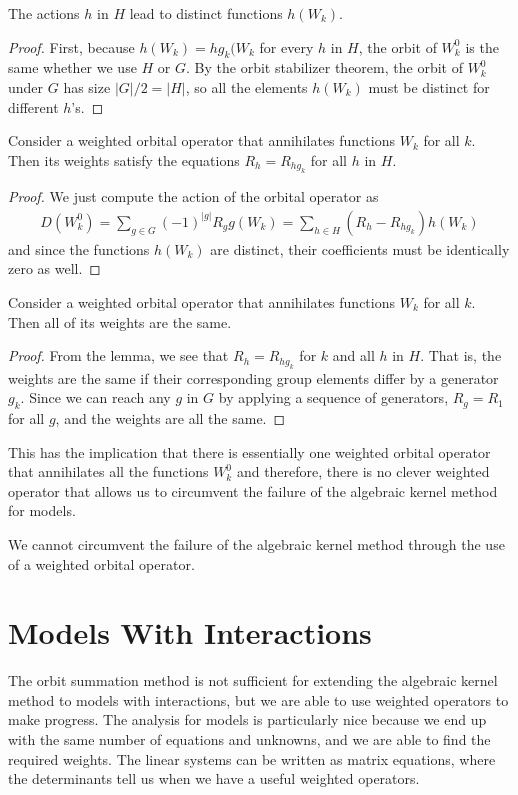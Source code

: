\begin{lem} The actions $h$ in $H$ lead to distinct functions $h(W_k)$.
\end{lem}
\begin{proof} First, because $h(W_k) = hg_k(W_k$ for every $h$ in $H$, the orbit of $W_k^0$ is the same whether we use $H$ or $G$. By the orbit stabilizer theorem, the orbit of $W_k^0$ under $G$ has size $|G|/2 = |H|$, so all the elements $h(W_k)$ must be distinct for different $h$'s.
\end{proof}

\begin{lem} Consider a weighted orbital operator that annihilates functions $W_k$ for all $k$. Then its weights satisfy the equations $R_h = R_{hg_k}$ for all $h$ in $H$.
\end{lem}
\begin{proof} We just compute the action of the orbital operator as
\begin{align}
	D(W_k^0) = \sum_{g \in G} (-1)^{|g|} R_g g(W_k)  = \sum_{h \in H} (R_h-R_{hg_k})h(W_k)
\end{align}
and since the functions $h(W_k)$ are distinct, their coefficients must be identically zero as well.
\end{proof}

\begin{thm} Consider a weighted orbital operator that annihilates functions $W_k$ for all $k$. Then all of its weights are the same.
\end{thm}
\begin{proof} From the lemma, we see that $R_h = R_{hg_k}$ for $k$ and all $h$ in $H$. That is, the weights are the same if their corresponding group elements differ by a generator $g_k$. Since we can reach any $g$ in $G$ by applying a sequence of generators, $R_g = R_1$ for all $g$, and the weights are all the same.
\end{proof}

This has the implication that there is essentially one weighted orbital operator that annihilates all the functions $W_k^0$ and therefore, there is no clever weighted operator that allows us to circumvent the failure of the algebraic kernel method for  \classic models.
\begin{cor} We cannot circumvent the failure of the algebraic kernel method through the use of a weighted orbital operator.
\end{cor}

\section{Models With Interactions}
The orbit summation method is not sufficient for extending the algebraic kernel method to models with interactions, but we are able to use weighted operators to make progress. The analysis for \twoD models is particularly nice because we end up with the same number of equations and unknowns, and we are able to find the required weights. The linear systems can be written as matrix equations, where the determinants tell us when we have a useful weighted operators. 


